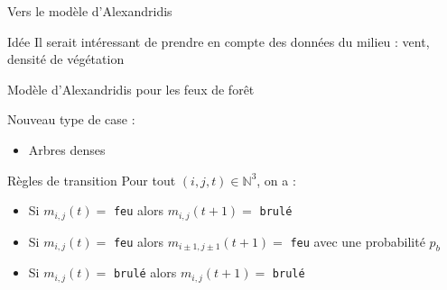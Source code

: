 \documentclass{beamer}
\begin{document}
\begin{frame}{Vers le modèle d'Alexandridis \hyperlink{jump}{\beamerbutton{ }} \hypertarget{7}{\beamerbutton{ }}}
    \begin{block}{Idée}
        Il serait intéressant de prendre en compte des données du milieu : vent, densité de végétation
    \end{block}
\end{frame}

\begin{frame}{Modèle d'Alexandridis pour les feux de forêt \hyperlink{jump}{\beamerbutton{ }} \hypertarget{8}{\beamerbutton{ }}}
    \begin{block}{Nouveau type de case :}
        \begin{itemize}
            \item Arbres denses
        \end{itemize}
    \end{block}

    \hspace{1cm}

    \begin{block}{Règles de transition}
        Pour tout $(i,j,t) \in \mathbb{N}^3$, on a :
        \begin{itemize}
            \item Si $m_{i,j} (t) = $ \texttt{feu} alors $m_{i,j} (t+1) = $ \texttt{brulé}
            \item Si $m_{i,j} (t) = $ \texttt{feu} alors $m_{i \pm 1,j \pm 1} (t+1) = $ \texttt{feu} avec une probabilité $p_b$
            \item Si $m_{i,j} (t) = $ \texttt{brulé} alors $m_{i,j} (t+1) = $ \texttt{brulé}
        \end{itemize}
    \end{block}
\end{frame}
\end{document}
